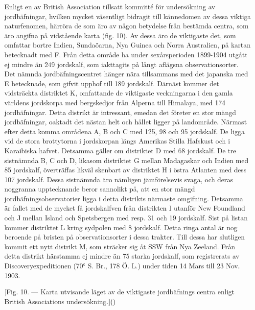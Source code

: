 \documentclass[a4paper, 12pt, oneside, swedish]{article}
\begin{document}
Enligt en av British Association tillsatt kommitté för undersökning av jordbäfningar, hvilken mycket väsentligt bidragit till kännedomen av dessa viktiga naturfenomen, härröra de som äro av någon betydelse från bestämda centra, som äro angifna på vidstående karta (fig. 10). Av dessa äro de viktigaste det, som omfattar bortre Indien, Sundaöarna, Nya Guinea och Norra Australien, på kartan betecknadt med F. Från detta område ha under sexårsperioden 1899-1904 utgått ej mindre än 249 jordskalf, som iakttagits på långt aflägsna observationsorter. Det nämnda jordbäfningscentret hänger nära tillsammans med det japanska med E betecknade, som gifvit upphof till 189 jordskalf. Därnäst kommer det vidsträckta distriktet K, omfattande de viktigaste veckningarna i den gamla världens jordskorpa med bergskedjor från Alperna till Himalaya, med 174 jordbäfningar. Detta distrikt är intressant, emedan det företer en stor mängd jordbäfningar, oaktadt det nästan helt och hållet ligger på landområde. Närmast efter detta komma områdena A, B och C med 125, 98 och 95 jordskalf. De ligga vid de stora brottytorna i jordskorpan längs Amerikas Stilla Hafskust och i Karaibiska hafvet. Detsamma gäller om distriktet D med 68 jordskalf. De tre sistnämnda B, C och D, likasom distriktet G mellan Madagaskar och Indien med 85 jordskalf, överträffas likväl skenbart av distriktet H i östra Atlanten med dess 107 jordskalf. Dessa sistnämnda äro nämligen jämförelsevis svaga, och deras noggranna upptecknande beror sannolikt på, att en stor mängd jordbäfningsobservatorier ligga i detta distrikts närmaste omgifning. Detsamma är fallet med de mycket få jordskalfven från distrikten I utanför New Foundland och J mellan Island och Spetsbergen med resp. 31 och 19 jordskalf. Sist på listan kommer distriktet L kring sydpolen med 8 jordskalf. Detta ringa antal är nog beroende på bristen på observationsorter i dessa trakter. Till dessa har slutligen kommit ett nytt distrikt M, som sträcker sig åt SSW från Nya Zeeland. Från detta distrikt härstamma ej mindre än 75 starka jordskalf, som registrerats av Discoveryexpeditionen (70° S. Br., 178 Ö. L.) under tiden 14 Mars till 23 Nov. 1903.

[Fig. 10. --- Karta utvisande läget av de viktigaste jordbäfnings centra enligt British Associations undersökning.]()
\end{document}
